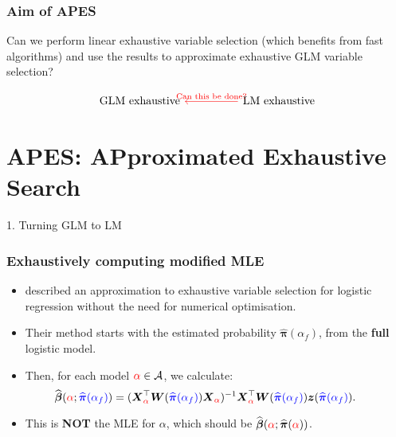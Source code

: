 \documentclass[12pt,aspectratio=169]{beamer}
\newcommand{\bX}{\boldsymbol{X}}
\newcommand{\bW}{\boldsymbol{W}}
\newcommand{\bz}{\boldsymbol{z}}
\newcommand{\bbetaHat}{\widehat{\boldsymbol{\beta}}}
\newcommand{\bPiHat}{\widehat{\boldsymbol{\pi}}}
\newcommand{\alphaFull}{\alpha_{f}}
\begin{document}
\begin{frame}[fragile] %
	\frametitle{Aim of APES}
	\begin{mdframed}[style=MyFrame]
	Can we perform linear exhaustive variable selection (which benefits from fast algorithms) and use the results to approximate exhaustive GLM variable selection?
	\end{mdframed}
\vspace{1.5cm}
\begin{equation*}
\begin{tikzcd}[column sep=huge]
\text{GLM exhaustive}
& \text{LM exhaustive}  \arrow[l, "\text{Can this be done?}"', red]
\end{tikzcd}
\end{equation*}
\end{frame}

\section{APES: APproximated Exhaustive Search}


\begin{frame}
\Huge{\color{themeBlue} 1. Turning GLM to LM}
\end{frame}

\begin{frame}[fragile] %
	\frametitle{Exhaustively computing modified MLE}
	\begin{itemize}
		\item \citep{Hosmer1989} described an approximation to exhaustive variable selection for logistic regression without the need for numerical optimisation. 
		
		\item Their method starts with the estimated probability {\color{blue} $ \bPiHat(\alphaFull) $}, from the \textbf{full} logistic model.
		
		\item Then, for each model $ {\color{red} \alpha } \in \mathcal{A} $, we calculate:
		\begin{equation*} \label{eqn:biasedBetaHat}
		\hspace*{-0.7cm}
		\bbetaHat({\color{red}\alpha}; {\color{blue}\bPiHat(\alphaFull)}) = (\bX_{{\color{red}\alpha}}^\top \bW({\color{blue}\bPiHat(\alphaFull)}) \bX_{{\color{red}\alpha}})^{-1}\bX_{{\color{red}\alpha}}^\top \bW({\color{blue}\bPiHat(\alphaFull)}) \bz({\color{blue}\bPiHat(\alphaFull)}).
		\end{equation*}
		
		\item This is \textbf{NOT} the MLE for $ \alpha $, which should be $\bbetaHat({\color{red}\alpha}; \bPiHat({\color{red}\alpha})) $. 
		

	\end{itemize}
\end{frame}
\end{document}
